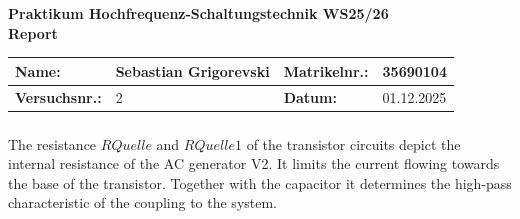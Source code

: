 \documentclass[a4paper,12pt]{article}
\begin{document}
	
	\begin{center}
		{\LARGE \textbf{Praktikum Hochfrequenz-Schaltungstechnik WS25/26}} \\[1em]
		{\large  \textbf{Report}} \\[0.5em]
	\end{center}
	
	\begin{center}
		\begin{tabular}{|l|p{4cm}|l|p{4cm}|}
			\hline
			\textbf{Name:} &  Sebastian Grigorevski & \textbf{Matrikelnr.:} &  35690104 \\
			\hline
			\textbf{Versuchsnr.:} & 2 & \textbf{Datum:} & 01.12.2025 \\
			\hline
		\end{tabular}
	\end{center}
	
	\vspace{1cm}
	\setcounter{section}{1}  %
	\setcounter{subsection}{5}  %
	\setcounter{subsubsection}{0}  %
	
	\subsubsection{}
	
	The resistance $RQuelle$ and $RQuelle1$ of the transistor circuits  depict the internal resistance of the AC generator V2. It limits the current flowing towards the base of the transistor.
	Together with the capacitor it determines the high-pass characteristic of the coupling to the system.
	
	\subsubsection{}
	
\end{document}
